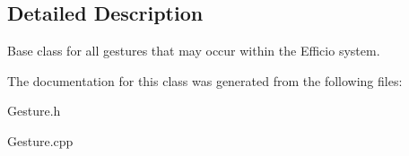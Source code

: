 \subsection{Detailed Description}
Base class for all gestures that may occur within the Efficio system. 

The documentation for this class was generated from the following files\+:\begin{DoxyCompactItemize}
\item 
Gesture.\+h\item 
Gesture.\+cpp\end{DoxyCompactItemize}
